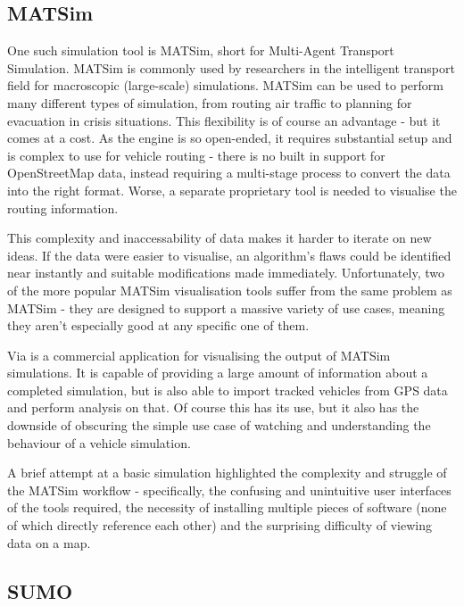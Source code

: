 \documentclass[ %
                    author={Alexander Hill},
                supervisor={Dr. Benjamin Sach},
                    degree={MEng},
                     title={MARMOSET},
                  subtitle={Multi-Agent Route Management using Online Simulation for Efficient Transportation},
                      type={research},
                      year={2016} ]{dissertation}
\begin{document}
\subsection{MATSim}

One such simulation tool is MATSim, short for Multi-Agent Transport Simulation.
MATSim is commonly used by researchers in the intelligent transport field for
macroscopic (large-scale) simulations. MATSim can be used to perform many
different types of simulation, from routing air traffic to planning for
evacuation in crisis situations. This flexibility is of course an advantage -
but it comes at a cost. As the engine is so open-ended, it requires substantial
setup and is complex to use for vehicle routing - there is no built in support
for OpenStreetMap data, instead requiring a multi-stage process to convert the
data into the right format. Worse, a separate proprietary tool is needed to
visualise the routing information.

This complexity and inaccessability of data makes it harder to iterate on new
ideas. If the data were easier to visualise, an algorithm's flaws could be
identified near instantly and suitable modifications made immediately.
Unfortunately, two of the more popular MATSim visualisation tools suffer from
the same problem as MATSim - they are designed to support a massive variety of
use cases, meaning they aren't especially good at any specific one of them.

Via is a commercial application for visualising the output of MATSim
simulations. It is capable of providing a large amount of information about a
completed simulation, but is also able to import tracked vehicles from GPS data
and perform analysis on that. Of course this has its use, but it also has the
downside of obscuring the simple use case of watching and understanding the
behaviour of a vehicle simulation.

A brief attempt at a basic simulation highlighted the complexity and struggle of
the MATSim workflow - specifically, the confusing and unintuitive user
interfaces of the tools required, the necessity of installing multiple pieces of
software (none of which directly reference each other) and the surprising
difficulty of viewing data on a map.

\subsection{SUMO}
\end{document}

